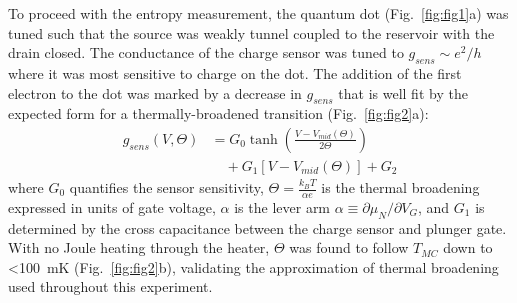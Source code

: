 \documentclass[twocolumn,showpacs,amsmath,amssymb,prl,aps,superscriptaddress]{revtex4-1}
\begin{document}
To proceed with the entropy measurement, the quantum dot (Fig.~\ref{fig:fig1}a) was tuned such that the source was weakly tunnel coupled to the reservoir with the drain closed.   The conductance of the charge sensor was tuned to $g_{sens}{\sim}e^2/h$ where it was most sensitive to charge on the dot.  The addition of the first electron to the dot was marked by a decrease in $g_{sens}$ that is well fit by the expected form for a thermally-broadened transition (Fig.~\ref{fig:fig2}a):
%
\begin{align}
\label{eqn:g}
        g_{sens}(V,\Theta) &= G_0 \tanh\left(\frac{V-V_{mid}(\Theta)}{2\Theta}\right)  \\
                        &\quad + G_1\left[V-V_{mid}(\Theta)\right] + G_2 \nonumber
\end{align}
%
where $G_0$ quantifies the sensor sensitivity, $\Theta = \frac{k_B T}{\alpha e}$ is the thermal broadening expressed in units of gate voltage, $\alpha$ is the lever arm $\alpha\equiv\partial \mu_{N}/\partial V_G$, and $G_1$ is determined by the cross capacitance between the charge sensor and plunger gate. With no Joule heating through the heater, $\Theta$ was found to follow $T_{MC}$ down to \SI{<100}{\milli\kelvin} (Fig.~\ref{fig:fig2}b), validating the approximation of thermal broadening used throughout this experiment.

\end{document}
